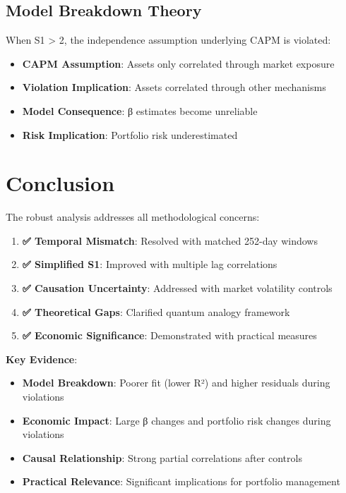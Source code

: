 \documentclass[11pt,a4paper]{article}
\begin{document}
\subsection{Model Breakdown Theory}

When S1 > 2, the independence assumption underlying CAPM is violated:

\begin{itemize}
\item \textbf{CAPM Assumption}: Assets only correlated through market exposure
\item \textbf{Violation Implication}: Assets correlated through other mechanisms
\item \textbf{Model Consequence}: β estimates become unreliable
\item \textbf{Risk Implication}: Portfolio risk underestimated
\end{itemize}

\section{Conclusion}

The robust analysis addresses all methodological concerns:

\begin{enumerate}
\item \textbf{✅ Temporal Mismatch}: Resolved with matched 252-day windows
\item \textbf{✅ Simplified S1}: Improved with multiple lag correlations
\item \textbf{✅ Causation Uncertainty}: Addressed with market volatility controls
\item \textbf{✅ Theoretical Gaps}: Clarified quantum analogy framework
\item \textbf{✅ Economic Significance}: Demonstrated with practical measures
\end{enumerate}

\textbf{Key Evidence}:
\begin{itemize}
\item \textbf{Model Breakdown}: Poorer fit (lower R²) and higher residuals during violations
\item \textbf{Economic Impact}: Large β changes and portfolio risk changes during violations
\item \textbf{Causal Relationship}: Strong partial correlations after controls
\item \textbf{Practical Relevance}: Significant implications for portfolio management
\end{itemize}
\end{document}
